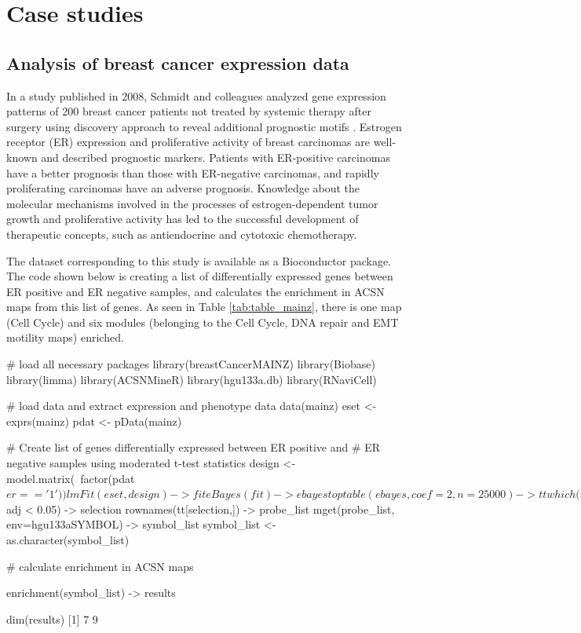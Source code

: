 \section[Case studies]{Case studies}

\subsection{Analysis of breast cancer expression data}
In a study published in 2008, Schmidt and colleagues analyzed gene expression
patterns of 200 breast cancer patients not treated by systemic therapy after
surgery using discovery approach to reveal additional prognostic motifs
\citep{schmidt2008humoral}. Estrogen receptor (ER) expression and proliferative
activity of breast carcinomas are well-known and described prognostic markers.
Patients with ER-positive carcinomas have a better prognosis than those with
ER-negative carcinomas, and rapidly proliferating carcinomas have an adverse
prognosis. Knowledge about the molecular mechanisms involved in the
processes of estrogen-dependent tumor growth and proliferative activity has led
to the successful development of therapeutic concepts, such as  antiendocrine and
cytotoxic chemotherapy. 

The dataset corresponding to this study is available as a Bioconductor package.
The code shown below is creating a list of differentially expressed genes
between ER positive and ER negative samples, and calculates the enrichment in
ACSN maps from this list of genes. As seen in Table \ref{tab:table_mainz},
there is one map (Cell Cycle) and six modules (belonging to the Cell Cycle, DNA
repair and EMT motility maps) enriched. 

\begin{example}
# load all necessary packages
library(breastCancerMAINZ)
library(Biobase)
library(limma)
library(ACSNMineR)
library(hgu133a.db)
library(RNaviCell)

# load data and extract expression and phenotype data 
data(mainz)
eset <- exprs(mainz)
pdat <- pData(mainz)

# Create list of genes differentially expressed between ER positive and 
# ER negative samples using moderated t-test statistics 
design <- model.matrix(~factor(pdat$er == '1'))
lmFit(eset, design) -> fit
eBayes(fit) -> ebayes
toptable(ebayes, coef=2,n=25000) -> tt
which(tt$adj < 0.05) -> selection
rownames(tt[selection,]) -> probe_list
mget(probe_list, env=hgu133aSYMBOL) -> symbol_list
symbol_list <- as.character(symbol_list)

# calculate enrichment in ACSN maps 

enrichment(symbol_list) -> results

dim(results)
[1] 7 9
\end{example}

